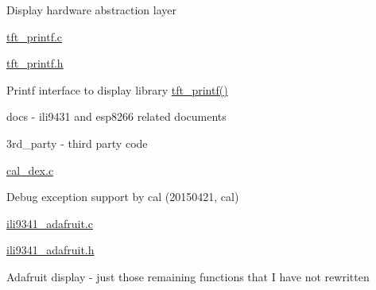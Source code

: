 \begin{DoxyItemize}
\begin{DoxyItemize}
\begin{DoxyItemize}
\begin{DoxyItemize}
\item Display hardware abstraction layer
\end{DoxyItemize}
\item \hyperlink{tft__printf_8c}{tft\+\_\+printf.\+c}
\item \hyperlink{tft__printf_8h}{tft\+\_\+printf.\+h}
\begin{DoxyItemize}
\item Printf interface to display library \hyperlink{tft__printf_8c_ad6d6dda4facdc045d477c0cc9403e0c1}{tft\+\_\+printf()}
\end{DoxyItemize}
\end{DoxyItemize}
\end{DoxyItemize}
\end{DoxyItemize}

docs -\/ ili9431 and esp8266 related documents


\begin{DoxyItemize}
\item 3rd\+\_\+party -\/ third party code
\begin{DoxyItemize}
\item \hyperlink{cal__dex_8c}{cal\+\_\+dex.\+c}
\begin{DoxyItemize}
\item Debug exception support by cal (20150421, cal)
\end{DoxyItemize}
\item \hyperlink{ili9341__adafruit_8c}{ili9341\+\_\+adafruit.\+c}
\item \hyperlink{ili9341__adafruit_8h}{ili9341\+\_\+adafruit.\+h}
\begin{DoxyItemize}
\item Adafruit display -\/ just those remaining functions that I have not rewritten
\end{DoxyItemize}
\end{DoxyItemize}
\end{DoxyItemize}

